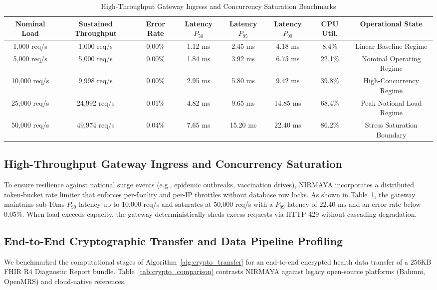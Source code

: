 \documentclass[journal,twocolumn]{IEEEtran}
\begin{document}
\begin{table}[t]
\caption{High-Throughput Gateway Ingress and Concurrency Saturation Benchmarks}
\label{tab:gateway_benchmarks}
\centering
\small
\begin{tabularx}{\textwidth}{cccccccc}
\toprule
\textbf{Nominal Load} & \textbf{Sustained Throughput} & \textbf{Error Rate} & \textbf{Latency $P_{50}$} & \textbf{Latency $P_{95}$} & \textbf{Latency $P_{99}$} & \textbf{CPU Util.} & \textbf{Operational State} \\
\midrule
1,000 req/s & 1,000 req/s & 0.00\% & 1.12 ms & 2.45 ms & 4.18 ms & 8.4\% & Linear Baseline Regime \\
5,000 req/s & 5,000 req/s & 0.00\% & 1.84 ms & 3.92 ms & 6.75 ms & 22.1\% & Nominal Operating Regime \\
10,000 req/s & 9,998 req/s & 0.00\% & 2.95 ms & 5.80 ms & 9.42 ms & 39.8\% & High-Concurrency Regime \\
25,000 req/s & 24,992 req/s & 0.01\% & 4.82 ms & 9.65 ms & 14.85 ms & 68.4\% & Peak National Load Regime \\
50,000 req/s & 49,974 req/s & 0.04\% & 7.65 ms & 15.20 ms & 22.40 ms & 86.2\% & Stress Saturation Boundary \\
\bottomrule
\end{tabularx}
\end{table}

\subsection{High-Throughput Gateway Ingress and Concurrency Saturation}
To ensure resilience against national surge events (e.g., epidemic outbreaks, vaccination drives), NIRMAYA incorporates a distributed token-bucket rate limiter that enforces per-facility and per-IP throttles without database row locks. As shown in Table~\ref{tab:gateway_benchmarks}, the gateway maintains sub-10ms $P_{99}$ latency up to 10,000 req/s and saturates at 50,000 req/s with a $P_{99}$ latency of $22.40\text{ ms}$ and an error rate below $0.05\%$. When load exceeds capacity, the gateway deterministically sheds excess requests via HTTP 429 without cascading degradation.

\subsection{End-to-End Cryptographic Transfer and Data Pipeline Profiling}
We benchmarked the computational stages of Algorithm~\ref{alg:crypto_transfer} for an end-to-end encrypted health data transfer of a 256KB FHIR R4 Diagnostic Report bundle. Table~\ref{tab:crypto_comparison} contrasts NIRMAYA against legacy open-source platforms (Bahmni, OpenMRS) and cloud-native references.
\end{document}
